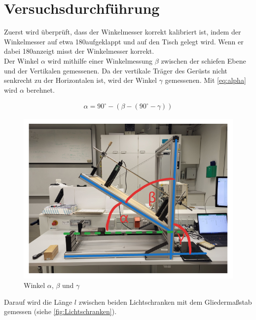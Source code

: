 \section{Versuchsdurchführung}

Zuerst wird überprüft, dass der Winkelmesser korrekt kalibriert ist, indem der Winkelmesser auf etwa 180\textdegree aufgeklappt und auf den Tisch gelegt wird. Wenn er dabei 180\textdegree anzeigt misst der Winkelmesser korrekt. \\
Der Winkel $\alpha$ wird mithilfe einer Winkelmessung $\beta$ zwischen der schiefen Ebene und der Vertikalen gemessenen. Da der vertikale Träger des Gerüsts nicht senkrecht zu der Horizontalen ist, wird der Winkel $\gamma$ gemessenen. Mit \autoref{eq:alpha} wird $\alpha$ berehnet.

\begin{align}
    \alpha = 90^\circ - (\beta - (90^\circ - \gamma))
    \label{eq:alpha}
\end{align}

\begin{figure}[ht]
    \centering
    \includegraphics{images/Versuch-Winkel.pdf}
    \caption[Winkelmessung]{Winkel $\alpha$, $\beta$ und $\gamma$}
    \label{fig:Winkelmessung}
\end{figure}

Darauf wird die Länge $l$ zwischen beiden Lichtschranken mit dem Gliedermaßstab gemessen (siehe \autoref{fig:Lichtschranken}).\\

